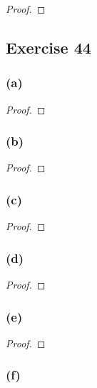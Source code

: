 \documentclass[14pt]{extarticle}
\begin{document}
\begin{proof}

\end{proof}

\subsection{Exercise 44}

\subsubsection{(a)}

\begin{proof}

\end{proof}

\subsubsection{(b)}

\begin{proof}

\end{proof}

\subsubsection{(c)}

\begin{proof}

\end{proof}

\subsubsection{(d)}

\begin{proof}

\end{proof}

\subsubsection{(e)}

\begin{proof}

\end{proof}

\subsubsection{(f)}
\end{document}
